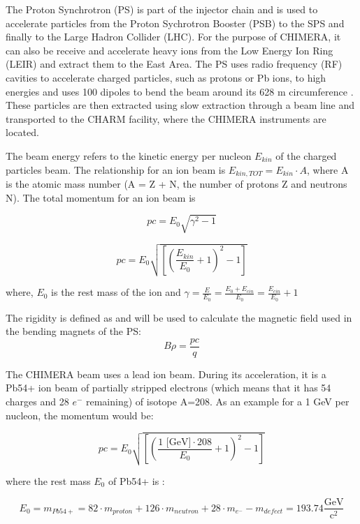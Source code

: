 
The Proton Synchrotron (PS) is part of the injector chain and is used to accelerate particles from the Proton Sychrotron Booster (PSB) to the SPS and finally to the Large Hadron Collider (LHC). For the purpose of CHIMERA, it can also be receive and accelerate heavy ions from the Low Energy Ion Ring (LEIR) and extract them to the East Area. The PS uses radio frequency (RF) cavities to accelerate charged particles, such as protons or Pb ions, to high energies and uses 100 dipoles to bend the beam around its 628 m circumference \cite{}. These particles are then extracted using slow extraction through a beam line and transported to the CHARM facility, where the CHIMERA instruments are located.

The beam energy refers to the kinetic energy per nucleon $E_{kin}$ of the charged particles beam. The relationship for an ion beam is $E_{kin, TOT}=E_{kin}\cdot A$, where A is the atomic mass number (A = Z + N, the number of protons Z and neutrons N). The total momentum for an ion beam is \cite{chao_handbook_2013}

$$pc={E_{0}\sqrt{\gamma^{2}-1}}$$

$$pc = E_{0}\sqrt{\left [ \left( \frac{E_{kin}}{E_{0}}+1\right )^{2}-1\right ]}$$

where, $E_{0}$ is the rest mass of the ion and $\gamma=\frac{E}{E_{0}}=\frac{E_{0}+E_{cin}}{E_{0}} = \frac{E_{cin}}{E_{0}}+1$

The rigidity is defined as and will be used to calculate the magnetic field used in the bending magnets of the PS:
$$B\rho = \frac{pc}{q}$$

The CHIMERA beam uses a lead ion beam. During its acceleration, it is a Pb54+ ion beam of partially stripped electrons (which means that it has 54 charges and 28 $e^{-}$ remaining) of isotope A=208. As an example for a 1 GeV per nucleon, the momentum would be:

$$pc = E_{0}\sqrt{\left [ \left( \frac{1\text{ [GeV]}\cdot 208}{E_{0}}+1\right )^{2}-1\right ]}$$

where the rest mass $E_{0}$ of Pb54+ is \cite{boston_university_nuclear_nodate}:

$$E_{0} = m_{Pb54+}= 82\cdot m_{proton} + 126\cdot m_{neutron} + 28\cdot m_{e^{-}} - m_{defect} = 193.74 \frac{\text{GeV}}{\text{c}^{2}}$$

